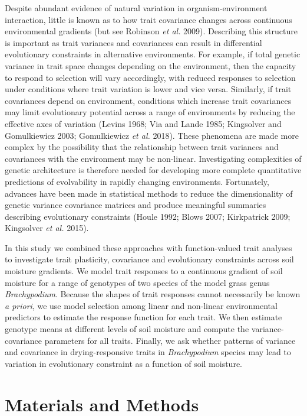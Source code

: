 \documentclass[jou,floatsintext]{apa6}
\begin{document}
Despite abundant evidence of natural variation in organism-environment interaction, little is known as to how trait covariance changes across continuous environmental gradients (but see Robinson \emph{et al.} 2009). Describing this structure is important as trait variances and covariances can result in differential evolutionary constraints in alternative environments. For example, if total genetic variance in trait space changes depending on the environment, then the capacity to respond to selection will vary accordingly, with reduced responses to selection under conditions where trait variation is lower and vice versa. Similarly, if trait covariances depend on environment, conditions which increase trait covariances may limit evolutionary potential across a range of environments by reducing the effective axes of variation (Levins 1968; Via and Lande 1985; Kingsolver and Gomulkiewicz 2003; Gomulkiewicz \emph{et al.} 2018). These phenomena are made more complex by the possibility that the relationship between trait variances and covariances with the environment may be non-linear. Investigating complexities of genetic architecture is therefore needed for developing more complete quantitative predictions of evolvability in rapidly changing environments. Fortunately, advances have been made in statistical methods to reduce the dimensionality of genetic variance covariance matrices and produce meaningful summaries describing evolutionary constraints (Houle 1992; Blows 2007; Kirkpatrick 2009; Kingsolver \emph{et al.} 2015).

In this study we combined these approaches with function-valued trait analyses to investigate trait plasticity, covariance and evolutionary constraints across soil moisture gradients. We model trait responses to a continuous gradient of soil moisture for a range of genotypes of two species of the model grass genus \emph{Brachypodium}. Because the shapes of trait responses cannot necessarily be known \emph{a priori}, we use model selection among linear and non-linear environmental predictors to estimate the response function for each trait. We then estimate genotype means at different levels of soil moisture and compute the variance-covariance parameters for all traits. Finally, we ask whether patterns of variance and covariance in drying-responsive traits in \emph{Brachypodium} species may lead to variation in evolutionary constraint as a function of soil moisture.

\hypertarget{materials-and-methods}{%
\section{Materials and Methods}\label{materials-and-methods}}
\end{document}
